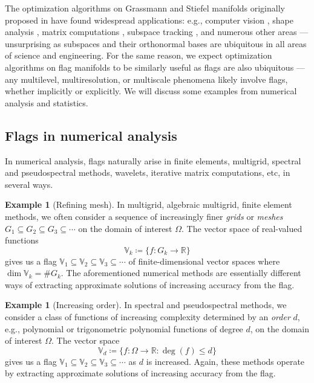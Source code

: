 \documentclass[11pt,reqno]{amsart}%
\theoremstyle{definition}
\newtheorem{example}[theorem]{Example}
\theoremstyle{remark}
\DeclareMathOperator*{\degree}{deg}
\begin{document}
The optimization algorithms on Grassmann and Stiefel manifolds originally proposed in \cite{EAS} have found widespread applications: e.g., computer vision \cite{WWF,WSCG}, shape analysis \cite{WW2012,Schulz2014}, matrix computations \cite{B2013,LL2001}, subspace tracking \cite{BNR}, and numerous other areas --- unsurprising as subspaces and their orthonormal bases are ubiquitous in all areas of science and engineering. For the same reason, we expect optimization algorithms on flag manifolds to be similarly useful as flags are also ubiquitous --- any multilevel, multiresolution, or multiscale phenomena likely involve flags, whether implicitly or explicitly. We will discuss some examples from numerical analysis and statistics.

\subsection{Flags in numerical analysis}
In numerical analysis, flags naturally arise in finite elements, multigrid, spectral and pseudospectral methods, wavelets, iterative matrix computations, etc, in several ways.
\begin{example}[Refining mesh]
In multigrid, algebraic multigrid, finite element methods, we often consider a sequence of increasingly finer \emph{grids} or \emph{meshes} $G_1 \subseteq G_2
\subseteq G_3 \subseteq \cdots$ on the domain of interest $\Omega$. The vector space of real-valued functions
\[
\mathbb{V}_k \coloneqq \{ f : G_k \to \mathbb{R} \}
\]
gives us a flag $\mathbb{V}_1 \subseteq \mathbb{V}_2 \subseteq  \mathbb{V}_3 \subseteq \cdots$ of finite-dimensional vector spaces where $\dim \mathbb{V}_k = \# G_k$. The aforementioned numerical methods are essentially different ways of extracting approximate solutions of increasing accuracy  from the flag.
\end{example}

\begin{example}[Increasing order]
In  spectral and pseudospectral methods, we consider a class of functions of increasing complexity determined by an \emph{order} $d$, e.g., polynomial or trigonometric polynomial functions of degree $d$, on the domain of interest $\Omega$. The vector space
\[
\mathbb{V}_d \coloneqq \{ f : \Omega \to \mathbb{R} : \degree(f) \le d \}
\]
gives us a flag  $\mathbb{V}_1 \subseteq \mathbb{V}_2 \subseteq  \mathbb{V}_3 \subseteq \cdots$ as $d$ is increased. Again, these methods operate by extracting approximate solutions of increasing accuracy  from the flag.
\end{example}
\end{document}
